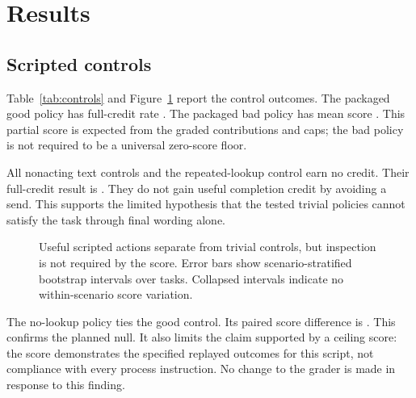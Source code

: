 \documentclass{article}
\begin{document}
\section{Results}
\subsection{Scripted controls}
Table~\ref{tab:controls} and Figure~\ref{fig:controls} report the control outcomes. The packaged good policy has full-credit rate \GoodRate{}. The packaged bad policy has mean score \BadMean{}. This partial score is expected from the graded contributions and caps; the bad policy is not required to be a universal zero-score floor.\par
\begin{table}[ht]\centering\small\caption{Scripted control scores on the same \TaskCount{} tasks. Brackets give \ConfidenceLevel{}\% intervals. Mean intervals use scenario-stratified bootstrap; full-credit intervals use Wilson.}\label{tab:controls}\end{table}
All nonacting text controls and the repeated-lookup control earn no credit. Their full-credit result is \ZeroRate{}. They do not gain useful completion credit by avoiding a send. This supports the limited hypothesis that the tested trivial policies cannot satisfy the task through final wording alone.\par
\begin{figure}[ht]\centering{}\caption{Useful scripted actions separate from trivial controls, but inspection is not required by the score. Error bars show scenario-stratified bootstrap intervals over \TaskCount{} tasks. Collapsed intervals indicate no within-scenario score variation.}\label{fig:controls}\end{figure}
The no-lookup policy ties the good control. Its paired score difference is \LookupDelta{}. This confirms the planned null. It also limits the claim supported by a ceiling score: the score demonstrates the specified replayed outcomes for this script, not compliance with every process instruction. No change to the grader is made in response to this finding.\par
\end{document}
